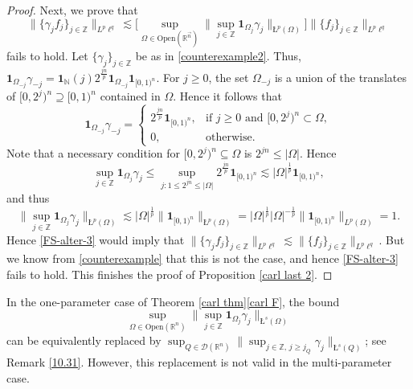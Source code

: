 \documentclass[11pt, reqno]{amsart}
\theoremstyle{definition}
\theoremstyle{remark}
\numberwithin{equation}{section}
\newcommand{\N}{\mathbb N}
\newcommand{\R}{\mathbb R}
\newcommand{\Z}{\mathbb Z}
\newcommand{\vn}{\vec n}
\newcommand{\one}{\mathbf{1}}
\newcommand{\aveL}{\textit{\L}}
\newcommand{\abs}[1]{|#1|}
\newcommand{\Norm}[2]{\|#1\|_{#2}}
\newcommand{\bNorm}[2]{\big\|#1\big\|_{#2}}
\newcommand{\BNorm}[2]{\Big\|#1\Big\|_{#2}}
\newcommand{\Open}{\mathrm{Open}}
\begin{document}
\begin{proof}
Next, we prove that
\begin{equation}\label{FS-alter-3}
\bNorm{\{\gamma_jf_j\}_{j\in\mathbb Z}}{L^p\ell^q}
\lesssim \Bigg[\sup_{\Omega\in\Open(\R^{\vn})}\Big\|\sup_{j\in\mathbb Z}\one_{\Omega_j}\gamma_j\Big\|_{\aveL^p(\Omega)}\Bigg]
\bNorm{\{ f_j\}_{j\in\mathbb Z}}{L^p\ell^q}
\end{equation}
fails to hold.
Let $\{\gamma_j\}_{j\in\Z}$ be as in \eqref{counterexample2}.
Thus, $\one_{\Omega_{-j}}\gamma_{-j}=\one_{\N}(j)2^{\frac{jn}{p}}\one_{\Omega_{-j}}\one_{[0,1)^n}$. For $j\geq 0$, the set $\Omega_{-j}$ is a union of the translates of $[0,2^j)^n\supseteq[0,1)^n$ contained in $\Omega$. Hence it follows that
\begin{equation*}
  \one_{\Omega_{-j}}\gamma_{-j}=
  \begin{cases} 2^{\frac{jn}{p}}\one_{[0,1)^n}, & \text{if }j\geq 0\text{ and }[0,2^j)^n\subset\Omega, \\ 0, & \text{otherwise}.\end{cases}
\end{equation*}
Note that a necessary condition for $[0,2^j)^n\subseteq\Omega$ is $2^{jn}\leq\abs{\Omega}$. Hence
\begin{equation*}
  \sup_{j\in\Z}\one_{\Omega_j}\gamma_j
  \leq\sup_{j: 1\leq 2^{jn}\leq\abs{\Omega}} 2^{\frac{jn}{p}}\one_{[0,1)^n}
  \lesssim \abs{\Omega}^{\frac1p}\one_{[0,1)^n},
\end{equation*}
and thus
\begin{equation*}
\BNorm{\sup_{j\in\Z}\one_{\Omega_j}\gamma_j}{\aveL^p(\Omega)}
\lesssim\abs{\Omega}^{\frac1p}\bNorm{\one_{[0,1)^n}}{\aveL^p(\Omega)}
=\abs{\Omega}^{\frac1p}\abs{\Omega}^{-\frac1p}\bNorm{\one_{[0,1)^n}}{L^p(\Omega)}=
1.
\end{equation*}
Hence \eqref{FS-alter-3} would imply that
$\Norm{\{\gamma_jf_j\}_{j\in\mathbb Z}}{L^p\ell^q}
\lesssim \Norm{\{ f_j\}_{j\in\mathbb Z}}{L^p\ell^q}$.
But we know from \eqref{counterexample} that this is not the case, and hence \eqref{FS-alter-3} fails to hold.
This finishes the proof of Proposition \ref{carl last 2}.
\end{proof}

In the one-parameter case of Theorem \ref{carl thm}\eqref{carl F},
the bound
$$
\sup_{\Omega\in\Open(\R^n)}\Big\|\sup_{j\in\mathbb Z}\one_{\Omega_j}\gamma_j\Big\|_{\aveL^s(\Omega)}
$$
can be equivalently replaced by
$\sup_{Q\in\mathscr D(\mathbb R^n)}
\|\sup_{j\in\mathbb Z,\,j\geq j_Q} \gamma_j\|_{\aveL^s(Q)}$;
see Remark \ref{10.31}.
However, this replacement is not valid in the multi-parameter case.
\end{document}
